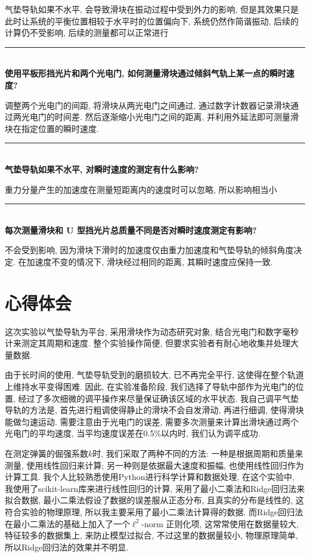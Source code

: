 \documentclass[zihao=5, UTF8]{article}
\theoremstyle{MyLineTheoremStyle} %
\theoremstyle{MyBlockTheoremStyle} %
\theoremstyle{MySubsubsectionStyle} %
\begin{document}
气垫导轨如果不水平, 会导致滑块在振动过程中受到外力的影响, 
但是其效果只是此时让系统的平衡位置相较于水平时的位置偏向下, 
系统仍然作简谐振动, 后续的计算仍不受影响, 后续的测量都可以正常进行
~\\
\hrule
~\\
\textbf{使用平板形挡光片和两个光电门, 如何测量滑块通过倾斜气轨上某一点的瞬时速度? }

调整两个光电门的间距, 将滑块从两光电门之间通过, 通过数字计数器记录滑块通过两光电门的时间差. 
然后逐渐缩小光电门之间的距离, 并利用外延法即可测量滑块在指定位置的瞬时速度. 
~\\
\hrule
~\\
\textbf{气垫导轨如果不水平, 对瞬时速度的测定有什么影响?}

重力分量产生的加速度在测量短距离内的速度时可以忽略, 所以影响相当小
~\\
\hrule
~\\
\textbf{每次测量滑块和 U 型挡光片总质量不同是否对瞬时速度测定有影响?}

不会受到影响, 因为滑块下滑时的加速度仅由重力加速度和气垫导轨的倾斜角度决定. 
在加速度不变的情况下, 滑块经过相同的距离, 其瞬时速度应保持一致. 

\section{心得体会}
这次实验以气垫导轨为平台, 采用滑块作为动态研究对象, 结合光电门和数字毫秒计来测定其周期和速度. 
整个实验操作简便, 但要求实验者有耐心地收集并处理大量数据. 

由于长时间的使用, 气垫导轨受到的磨损较大, 已不再完全平行, 这使得在整个轨道上维持水平变得困难. 
因此, 在实验准备阶段, 我们选择了导轨中部作为光电门的位置, 
经过了多次细微的调平操作来尽量保证确该区域的水平状态.
我自己调平气垫导轨的方法是, 首先进行粗调使得静止的滑块不会自发滑动,
再进行细调, 使得滑块能做匀速运动. 需要注意由于光电门的误差,
需要多次测量来计算出滑块通过两个光电门的平均速度,
当平均速度误差在0.5\%以内时, 我们认为调平成功.

在测定弹簧的倔强系数$k$时, 我们采取了两种不同的方法: 
一种是根据周期和质量来测量, 使用线性回归来计算; 
另一种则是依据最大速度和振幅, 也使用线性回归作为计算工具.
我个人比较熟悉使用Python进行科学计算和数据处理, 
在这个实验中, 我使用了scikit-learn库来进行线性回归的计算,
采用了最小二乘法和Ridge回归法来拟合数据, 
最小二乘法假设了数据的误差服从正态分布, 且真实的分布是线性的, 
这符合实验的物理原理, 所以我主要采用了最小二乘法计算得的数据.
而Ridge回归法在最小二乘法的基础上加入了一个$\ell^2$-norm 正则化项,
这常常使用在数据量较大, 特征较多的数据集上, 来防止模型过拟合,
不过这里的数据量较小, 物理原理简单, 所以Ridge回归法的效果并不明显.
\end{document}
